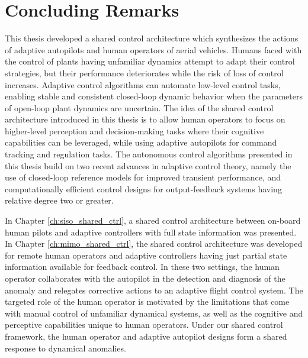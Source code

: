 \chapter{Concluding Remarks} \label{ch:conclusion}

This thesis developed a shared control architecture which synthesizes the actions of adaptive autopilots and human operators of aerial vehicles. Humans faced with the control of plants having unfamiliar dynamics attempt to adapt their control strategies, but their performance deteriorates while the risk of loss of control increases. Adaptive control algorithms can automate low-level control tasks, enabling stable and consistent closed-loop dynamic behavior when the parameters of open-loop plant dynamics are uncertain. The idea of the shared control architecture introduced in this thesis is to allow human operators to focus on higher-level perception and decision-making tasks where their cognitive capabilities can be leveraged, while using adaptive autopilots for command tracking and regulation tasks. The autonomous control algorithms presented in this thesis build on two recent advances in adaptive control theory, namely the use of closed-loop reference models for improved transient performance, and computationally efficient control designs for output-feedback systems having relative degree two or greater. 

In Chapter \ref{ch:siso_shared_ctrl}, a shared control architecture between on-board human pilots and adaptive controllers with full state information was presented. In Chapter \ref{ch:mimo_shared_ctrl}, the shared control architecture was developed for remote human operators and adaptive controllers having just partial state information available for feedback control. In these two settings, the human operator collaborates with the autopilot in the detection and diagnosis of the anomaly and relegates corrective actions to an adaptive flight control system. The targeted role of the human operator is motivated by the limitations that come with manual control of unfamiliar dynamical systems, as well as the cognitive and perceptive capabilities unique to human operators. Under our shared control framework, the human operator and adaptive autopilot designs form a shared response to dynamical anomalies. 

